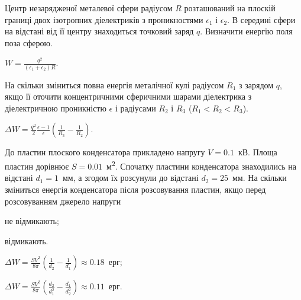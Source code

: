\begin{problem}
Центр незарядженої металевої сфери радіусом $R$ розташований на плоскій границі двох ізотропних діелектриків з проникностями $\epsilon_1$ і $\epsilon_2$. В середині сфери на відстані від її центру знаходиться точковий заряд $q$. Визначити енергію поля поза сферою.
\begin{solution}
	$W = \frac{q^2}{(\epsilon_1 + \epsilon_2)R}$.
\end{solution}
\end{problem}

\begin{problem}
На скільки зміниться повна енергія металічної кулі радіусом $R_1$ з зарядом $q$, якщо її оточити концентричними сферичними шарами діелектрика з діелектричною проникністю $\epsilon$ і радіусами $R_2$ і $R_3$ ($R_1<R_2<R_3$).
\begin{solution}
	$\Delta W = \frac{q^2}{2}\frac{\epsilon - 1}{\epsilon} \left( \frac{1}{R_3} - \frac{1}{R_2} \right) $.
\end{solution}
\end{problem}

\begin{problem}
    До пластин плоского конденсатора прикладено напругу $V = 0.1$~кВ. Площа пластин дорівнює $S = 0.01$~м\textsuperscript{2}. Спочатку пластини конденсатора знаходились на відстані $d_1 = 1$~мм, а згодом їх розсунули до відстані $d_2 = 25$~мм. На скільки зміниться енергія конденсатора після розсовування пластин, якщо перед розсовуванням джерело напруги 
	\begin{enumerate*}[label=\alph*)]
		\item не відмикають;
		\item відмикають.
	\end{enumerate*}
\begin{solution}
	\begin{enumerate*}[label=\alph*)]
		\item $\Delta W = \frac{SV^2}{8\pi}\left( \frac{1}{d_2} - \frac{1}{d_1}\right) \approx 0.18$~ерг;
		\item $\Delta W = \frac{SV^2}{8\pi}\left( \frac{d_2}{d_1^2} - \frac{d_1}{d_2^2}\right) \approx 0.11$~ерг.
	\end{enumerate*}
\end{solution}
\end{problem}

